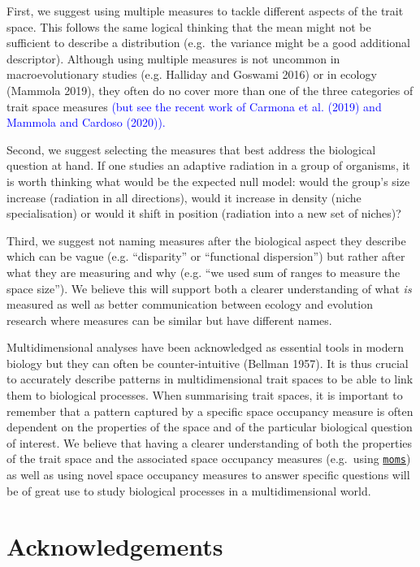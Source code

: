 \documentclass[]{article}
\begin{document}
First, we suggest using multiple measures to tackle different aspects of
the trait space. This follows the same logical thinking that the mean
might not be sufficient to describe a distribution (e.g.~the variance
might be a good additional descriptor). Although using multiple measures
is not uncommon in macroevolutionary studies (e.g. Halliday and Goswami
2016) or in ecology (Mammola 2019), they often do no cover more than one
of the three categories of trait space measures
\textcolor{blue}{(but see the recent work of Carmona
et al. (2019) and Mammola and Cardoso (2020)).}

Second, we suggest selecting the measures that best address the
biological question at hand. If one studies an adaptive radiation in a
group of organisms, it is worth thinking what would be the expected null
model: would the group's size increase (radiation in all directions),
would it increase in density (niche specialisation) or would it shift in
position (radiation into a new set of niches)?

Third, we suggest not naming measures after the biological aspect they
describe which can be vague (e.g. ``disparity'' or ``functional
dispersion'') but rather after what they are measuring and why (e.g.
``we used sum of ranges to measure the space size''). We believe this
will support both a clearer understanding of what \emph{is} measured as
well as better communication between ecology and evolution research
where measures can be similar but have different names.

Multidimensional analyses have been acknowledged as essential tools in
modern biology but they can often be counter-intuitive (Bellman 1957).
It is thus crucial to accurately describe patterns in multidimensional
trait spaces to be able to link them to biological processes. When
summarising trait spaces, it is important to remember that a pattern
captured by a specific space occupancy measure is often dependent on the
properties of the space and of the particular biological question of
interest. We believe that having a clearer understanding of both the
properties of the trait space and the associated space occupancy
measures (e.g.~using
\href{https://tguillerme.shinyapps.io/moms/}{\texttt{moms}}) as well as
using novel space occupancy measures to answer specific questions will
be of great use to study biological processes in a multidimensional
world.

\section{Acknowledgements}\label{acknowledgements}
\end{document}
